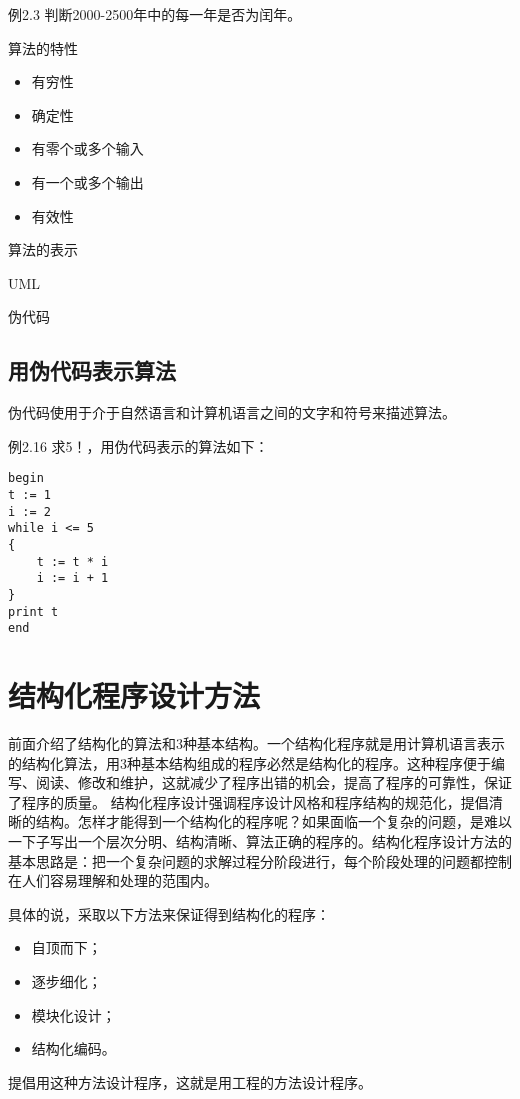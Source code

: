 例2.3 判断2000-2500年中的每一年是否为闰年。

算法的特性
\begin{itemize}
	\item 有穷性
	\item 确定性
	\item 有零个或多个输入
	\item 有一个或多个输出
	\item 有效性
\end{itemize}

算法的表示

UML

伪代码

\subsection{用伪代码表示算法}

伪代码使用于介于自然语言和计算机语言之间的文字和符号来描述算法。

例2.16 求5！，用伪代码表示的算法如下：
\begin{lstlisting}
begin
t := 1
i := 2
while i <= 5
{
	t := t * i
	i := i + 1
}
print t
end
\end{lstlisting}

\section{结构化程序设计方法}

前面介绍了结构化的算法和3种基本结构。一个结构化程序就是用计算机语言表示的结构化算法，用3种基本结构组成的程序必然是结构化的程序。这种程序便于编写、阅读、修改和维护，这就减少了程序出错的机会，提高了程序的可靠性，保证了程序的质量。
结构化程序设计强调程序设计风格和程序结构的规范化，提倡清晰的结构。怎样才能得到一个结构化的程序呢？如果面临一个复杂的问题，是难以一下子写出一个层次分明、结构清晰、算法正确的程序的。结构化程序设计方法的基本思路是：把一个复杂问题的求解过程分阶段进行，每个阶段处理的问题都控制在人们容易理解和处理的范围内。

具体的说，采取以下方法来保证得到结构化的程序：
\begin{itemize}
	\item 自顶而下；
	\item 逐步细化；
	\item 模块化设计；
	\item 结构化编码。
\end{itemize}

提倡用这种方法设计程序，这就是用工程的方法设计程序。

